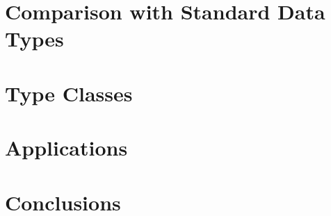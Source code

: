 \documentclass{jfp}
\begin{document}
\section{Comparison with Standard Data Types}

\section{Type Classes}

\section{Applications}

\section{Conclusions}

\label{lastpage01}
\end{document}
